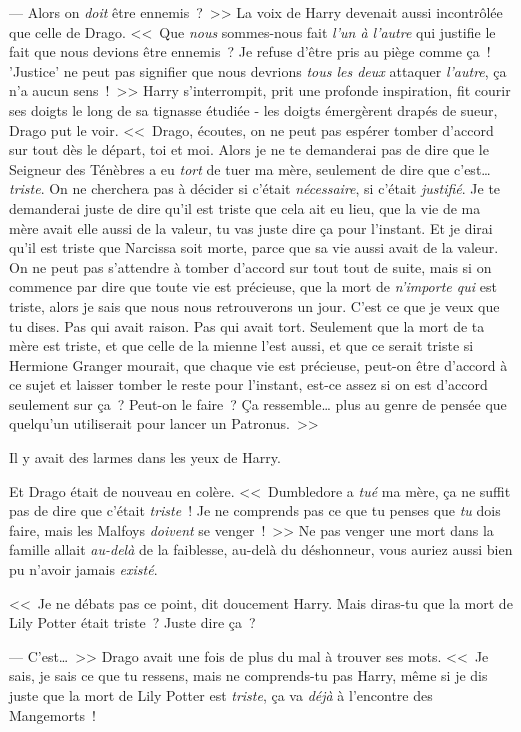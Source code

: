 --- Alors on \emph{doit} être ennemis~?~>> La voix de Harry devenait aussi incontrôlée que celle de Drago. <<~Que \emph{nous} sommes-nous fait \emph{l'un à l'autre} qui justifie le fait que nous devions être ennemis~? Je refuse d'être pris au piège comme ça~! 'Justice' ne peut pas signifier que nous devrions \emph{tous les deux} attaquer \emph{l'autre}, ça n'a aucun sens~!~>> Harry s'interrompit, prit une profonde inspiration, fit courir ses doigts le long de sa tignasse étudiée - les doigts émergèrent drapés de sueur, Drago put le voir. <<~Drago, écoutes, on ne peut pas espérer tomber d'accord sur tout dès le départ, toi et moi. Alors je ne te demanderai pas de dire que le Seigneur des Ténèbres a eu \emph{tort} de tuer ma mère, seulement de dire que c'est… \emph{triste}. On ne cherchera pas à décider si c'était \emph{nécessaire}, si c'était \emph{justifié}. Je te demanderai juste de dire qu'il est triste que cela ait eu lieu, que la vie de ma mère avait elle aussi de la valeur, tu vas juste dire ça pour l'instant. Et je dirai qu'il est triste que Narcissa soit morte, parce que sa vie aussi avait de la valeur. On ne peut pas s'attendre à tomber d'accord sur tout tout de suite, mais si on commence par dire que toute vie est précieuse, que la mort de \emph{n'importe qui} est triste, alors je sais que nous nous retrouverons un jour. C'est ce que je veux que tu dises. Pas qui avait raison. Pas qui avait tort. Seulement que la mort de ta mère est triste, et que celle de la mienne l'est aussi, et que ce serait triste si Hermione Granger mourait, que chaque vie est précieuse, peut-on être d'accord à ce sujet et laisser tomber le reste pour l'instant, est-ce assez si on est d'accord seulement sur ça~? Peut-on le faire~? Ça ressemble… plus au genre de pensée que quelqu'un utiliserait pour lancer un Patronus.~>>

Il y avait des larmes dans les yeux de Harry.

Et Drago était de nouveau en colère. <<~Dumbledore a \emph{tué} ma mère, ça ne suffit pas de dire que c'était \emph{triste}~! Je ne comprends pas ce que tu penses que \emph{tu} dois faire, mais les Malfoys \emph{doivent} se venger~!~>> Ne pas venger une mort dans la famille allait \emph{au-delà} de la faiblesse, au-delà du déshonneur, vous auriez aussi bien pu n'avoir jamais \emph{existé}.

<<~Je ne débats pas ce point, dit doucement Harry. Mais diras-tu que la mort de Lily Potter était triste~? Juste dire ça~?

--- C'est…~>> Drago avait une fois de plus du mal à trouver ses mots. <<~Je sais, je sais ce que tu ressens, mais ne comprends-tu pas Harry, même si je dis juste que la mort de Lily Potter est \emph{triste}, ça va \emph{déjà} à l'encontre des Mangemorts~!

